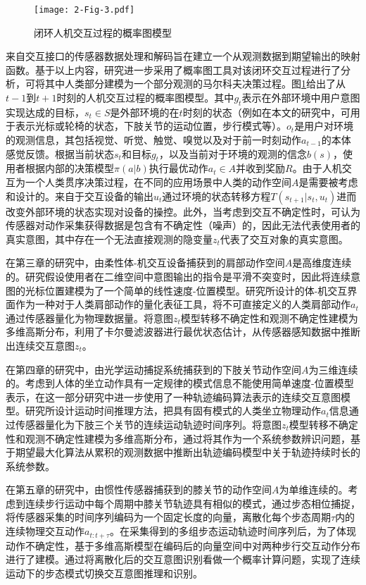 \begin{figure}[htb]
    \centering
    \texttt{[image: 2-Fig-3.pdf]}
    \caption{闭环人机交互过程的概率图模型}
    \label{2-fig-3}
\end{figure}

来自交互接口的传感器数据处理和解码旨在建立一个从观测数据到期望输出的映射函数。基于以上内容，研究进一步采用了概率图工具对该闭环交互过程进行了分析，可将其中人类部分建模为一个部分观测的马尔科夫决策过程。图\ref{2-fig-3}给出了从$t-1$到$t+1$时刻的人机交互过程的概率图模型。其中${g_t}$表示在外部环境中用户意图实现达成的目标，${s_t} \in S$是外部环境的在$t$时刻的状态（例如在本文的研究中，可用于表示光标或轮椅的状态，下肢关节的运动位置，步行模式等）。${o_t}$是用户对环境的观测信息，其包括视觉、听觉、触觉、嗅觉以及对于前一时刻动作${a_{t - 1}}$的本体感觉反馈。根据当前状态${s_t}$和目标${g_t}$，以及当前对于环境的观测的信念$b(s)$，使用者根据内部的决策模型$\pi(a|b)$执行最优动作${a_t} \in A $并收到奖励$R$。由于人机交互为一个人类贯序决策过程，在不同的应用场景中人类的动作空间$A $是需要被考虑和设计的。来自于交互设备的输出${u_t}$通过环境的状态转移方程$T({s_{t+1}}|{s_{t}},{u_{t}})$进而改变外部环境的状态实现对设备的操控。此外，当考虑到交互不确定性时，可认为传感器对动作采集获得数据是包含有不确定性（噪声）的，因此无法代表使用者的真实意图，其中存在一个无法直接观测的隐变量$z_t$代表了交互对象的真实意图。

在第三章的研究中，由柔性体-机交互设备捕获到的肩部动作空间$A $是高维度连续的。研究假设使用者在二维空间中意图输出的指令是平滑不突变时，因此将连续意图的光标位置建模为了一个简单的线性速度-位置模型。研究所设计的体-机交互界面作为一种对于人类肩部动作的量化表征工具，将不可直接定义的人类肩部动作${a_t}$通过传感器量化为物理数据量。将意图${z_t}$模型转移不确定性和观测不确定性建模为多维高斯分布，利用了卡尔曼滤波器进行最优状态估计，从传感器感知数据中推断出连续交互意图$z_t$。

在第四章的研究中，由光学运动捕捉系统捕获到的下肢关节动作空间$A $为三维连续的。考虑到人体的坐立动作具有一定规律的模式信息不能使用简单速度-位置模型表示，在这一部分研究中进一步使用了一种轨迹编码算法表示的连续交互意图模型。研究所设计运动时间推理方法，把具有固有模式的人类坐立物理动作${a_t}$信息通过传感器量化为下肢三个关节的连续运动轨迹时间序列。将意图${z_t}$模型转移不确定性和观测不确定性建模为多维高斯分布，通过将其作为一个系统参数辨识问题，基于期望最大化算法从累积的观测数据中推断出轨迹编码模型中关于轨迹持续时长的系统参数。

在第五章的研究中，由惯性传感器捕获到的膝关节的动作空间$A $为单维连续的。考虑到连续步行运动中每个周期中膝关节轨迹具有相似的模式，通过步态相位捕捉，将传感器采集的时间序列编码为一个固定长度的向量，离散化每个步态周期$\tau$内的连续物理交互动作${a_{t:t+\tau}}$。在采集得到的多组步态运动轨迹时间序列后，为了体现动作不确定性，基于多维高斯模型在编码后的向量空间中对两种步行交互动作分布进行了建模。通过将离散化后的交互意图识别看做一个概率计算问题，实现了连续运动下的步态模式切换交互意图推理和识别。


